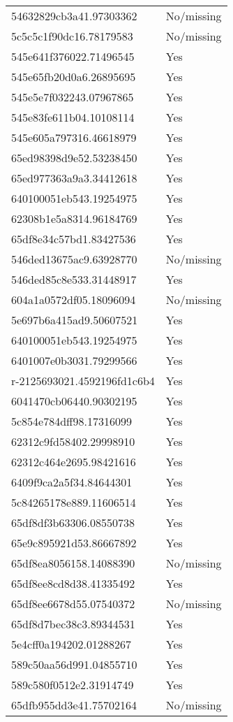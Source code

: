 \begin{tabular}{ll}
54632829cb3a41.97303362 & No/missing \\
5c5c5c1f90dc16.78179583 & No/missing \\
545e641f376022.71496545 & Yes \\
545e65fb20d0a6.26895695 & Yes \\
545e5e7f032243.07967865 & Yes \\
545e83fe611b04.10108114 & Yes \\
545e605a797316.46618979 & Yes \\
65ed98398d9e52.53238450 & Yes \\
65ed977363a9a3.34412618 & Yes \\
640100051eb543.19254975 & Yes \\
62308b1e5a8314.96184769 & Yes \\
65df8e34c57bd1.83427536 & Yes \\
546ded13675ac9.63928770 & No/missing \\
546ded85c8e533.31448917 & Yes \\
604a1a0572df05.18096094 & No/missing \\
5e697b6a415ad9.50607521 & Yes \\
640100051eb543.19254975 & Yes \\
6401007e0b3031.79299566 & Yes \\
r-2125693021.4592196fd1c6b4 & Yes \\
6041470cb06440.90302195 & Yes \\
5c854e784dff98.17316099 & Yes \\
62312c9fd58402.29998910 & Yes \\
62312c464e2695.98421616 & Yes \\
6409f9ca2a5f34.84644301 & Yes \\
5c84265178e889.11606514 & Yes \\
65df8df3b63306.08550738 & Yes \\
65e9c895921d53.86667892 & Yes \\
65df8ea8056158.14088390 & No/missing \\
65df8ee8cd8d38.41335492 & Yes \\
65df8ee6678d55.07540372 & No/missing \\
65df8d7bec38c3.89344531 & Yes \\
5e4cff0a194202.01288267 & Yes \\
589c50aa56d991.04855710 & Yes \\
589c580f0512e2.31914749 & Yes \\
65dfb955dd3e41.75702164 & No/missing \\

\end{tabular}
